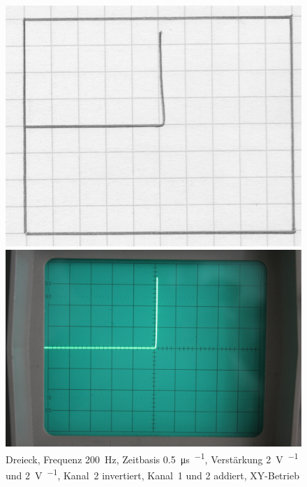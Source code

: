 \begin{figure}[htbp]
	\centering
	\begin{minipage}{.45\linewidth}
	\includegraphics[width=\linewidth]{Oszi_Hand/787.jpg}
	\end{minipage}
	\hfill
	\begin{minipage}{.45\linewidth}
	\includegraphics[width=\linewidth]{Oszi_Foto/787.jpg}
	\end{minipage}
	\caption{%
		Dreieck, Frequenz \SI{200}{\hertz},
		Zeitbasis \SI{.5}{\micro\second\per\division},
		Verstärkung \SI{2}{\volt\per\division} und \SI{2}{\volt\per\division},
		Kanal~2 invertiert, Kanal~1 und 2 addiert, XY-Betrieb
	}
	\label{fig:787}
\end{figure}

